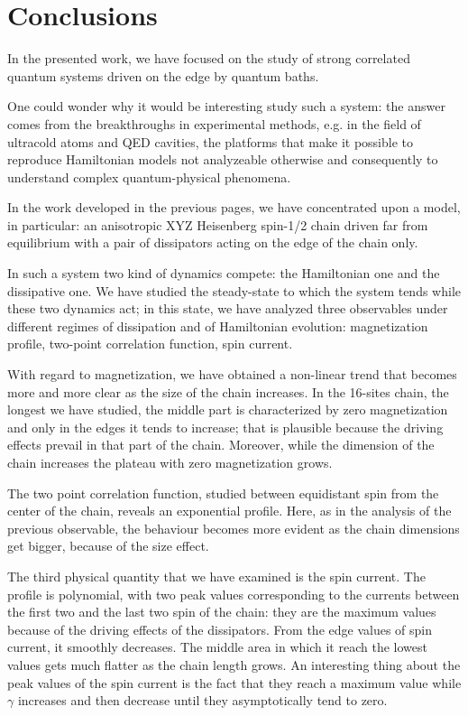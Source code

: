 \chapter*{Conclusions}

\label{Conclusions}

In the presented work, we have focused on the study of strong correlated quantum systems driven on the edge by quantum baths. %

One could wonder why it would be interesting study such a system: the answer comes from the breakthroughs in  experimental methods, e.g. in the field of ultracold atoms and QED cavities, the platforms that make it possible to reproduce Hamiltonian models not analyzeable otherwise and consequently to understand complex quantum-physical phenomena. 

In the work developed in the previous pages, we have concentrated upon a model, in particular: an anisotropic XYZ Heisenberg spin-1/2 chain driven far from equilibrium with a pair of dissipators acting on the edge of the chain only.

In such a system two kind of dynamics compete: the Hamiltonian one and the dissipative one. We have studied the steady-state to which the system tends while these two dynamics act; in this state, we have analyzed three observables under different regimes of dissipation and of Hamiltonian evolution: magnetization profile, two-point correlation function, spin current.

With regard to magnetization, we have obtained a non-linear trend that becomes more and more clear as the size of the chain increases. In the 16-sites chain, the longest we have studied, the middle part is characterized by zero magnetization and only in the edges it tends to increase; that is plausible because the driving effects prevail in that part of the chain. Moreover, while the dimension of the chain increases the plateau with zero magnetization grows. 

The two point correlation function, studied between equidistant spin from the center of the chain, reveals an exponential profile. Here, as in the analysis of the previous observable, the behaviour becomes more evident as the chain dimensions get bigger, because of the size effect.

The third physical quantity that we have examined is the spin current. The profile is polynomial, with two peak values corresponding to the currents between the first two and the last two spin of the chain: they are the maximum values because of the driving effects of the dissipators. From the edge values of spin current, it smoothly decreases. The middle area in which it reach the lowest values gets much flatter as the chain length grows. An interesting thing about the peak values of the spin current is the fact that they reach a maximum value while $\gamma$ increases and then decrease until they  asymptotically tend to zero.

